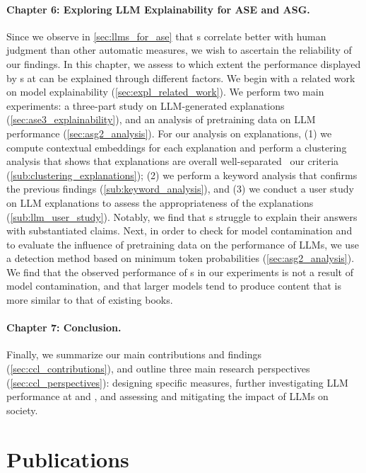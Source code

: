 \paragraph{Chapter 6: Exploring LLM Explainability for ASE and ASG.}
Since we observe in \autoref{sec:llms_for_ase} that {\llm}s correlate better with human judgment than other automatic measures, we wish to ascertain the reliability of our findings. In this chapter, we assess to which extent the performance displayed by {\llm}s at {\asefull} can be explained through different factors. We begin with a related work on model explainability (\autoref{sec:expl_related_work}). We perform two main experiments: a three-part study on LLM-generated explanations (\autoref{sec:ase3_explainability}), and an analysis of pretraining data on LLM performance (\autoref{sec:asg2_analysis}). For our analysis on {\llm} explanations, (1) we compute contextual embeddings for each explanation and perform a clustering analysis that shows that {\llm} explanations are overall well-separated {\wrt}\ our criteria (\autoref{sub:clustering_explanations}); (2) we perform a keyword analysis that confirms the previous findings (\autoref{sub:keyword_analysis}), and (3) we conduct a user study on LLM explanations to assess the appropriateness of the explanations (\autoref{sub:llm_user_study}). Notably, we find that {\llm}s struggle to explain their answers with substantiated claims. Next, in order to check for model contamination and to evaluate the influence of pretraining data on the {\asg} performance of LLMs, we use a detection method based on minimum token probabilities (\autoref{sec:asg2_analysis}). We find that the observed performance of {\llm}s in our experiments is not a result of model contamination, and that larger models tend to produce content that is more similar to that of existing books.

\paragraph{Chapter 7: Conclusion.} 
Finally, we summarize our main contributions and findings (\autoref{sec:ccl_contributions}), and outline three main research perspectives (\autoref{sec:ccl_perspectives}): designing specific {\asefull} measures, further investigating LLM performance at {\asg} and {\ase}, and assessing and mitigating the impact of LLMs on society.

\clearpage

\section{Publications}

